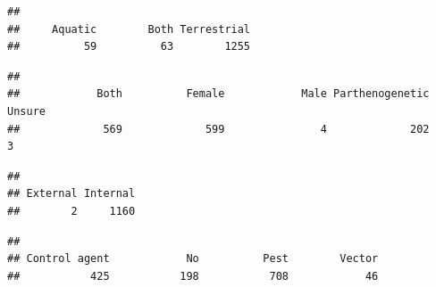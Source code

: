 \documentclass[
]{article}
\newenvironment{Shaded}{\begin{snugshade}}{\end{snugshade}}
\newcommand{\FunctionTok}[1]{\textcolor[rgb]{0.13,0.29,0.53}{\textbf{#1}}}
\newcommand{\NormalTok}[1]{#1}
\newcommand{\SpecialCharTok}[1]{\textcolor[rgb]{0.81,0.36,0.00}{\textbf{#1}}}
\begin{document}
\begin{Shaded}
\end{Shaded}

\begin{verbatim}
## 
##     Aquatic        Both Terrestrial 
##          59          63        1255
\end{verbatim}

\begin{Shaded}
\end{Shaded}

\begin{verbatim}
## 
##            Both          Female            Male Parthenogenetic          Unsure 
##             569             599               4             202               3
\end{verbatim}

\begin{Shaded}
\end{Shaded}

\begin{verbatim}
## 
## External Internal 
##        2     1160
\end{verbatim}

\begin{Shaded}
\end{Shaded}

\begin{verbatim}
## 
## Control agent            No          Pest        Vector 
##           425           198           708            46
\end{verbatim}

\begin{Shaded}
\end{Shaded}
\end{document}
